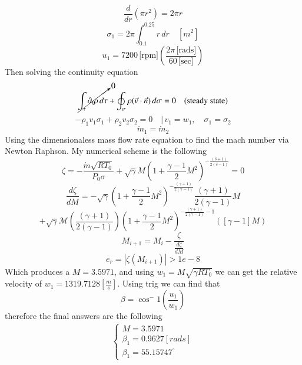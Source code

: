 \documentclass[12pt]{exam}
\begin{document}
\begin{questions}
\begin{solutionorbox}[\stretch{1}]
\[\frac{d}{dr} \left( \pi r^2 \right) = 2 \pi r\]
\[\sigma_1 = 2 \pi \int_{0.1}^{0.25} r \, dr \quad \left[ m^2 \right]\]
\[u_1 = 7200 \, \text{[rpm]} \left( \frac{2 \pi \, \text{[rads]}}{60 \, \text{[sec]}} \right)\]
Then solving the continuity equation
\[\cancelto{0}{\int_{\tau} \partial_t \rho \, d\tau} + \oint_{\sigma} \rho (\vec{v} \cdot \vec{n}) \, d\sigma = 0
\quad \text{(steady state)}\]
\[-\rho_1 v_1 \sigma_1 + \rho_2 v_2 \sigma_2 = 0 \quad \Bigg| \, v_1 = w_1, \quad \sigma_1 = \sigma_2\]
\[\dot{m}_1 = \dot{m}_2\]
Using the dimensionaless mass flow rate equation to find the mach number via Newton Raphson.
My numerical scheme is the following
\[\zeta = -\frac{\dot{m}\sqrt{R T_0}}{P_0 \sigma} + \sqrt{\gamma} M \left( 1 + \frac{\gamma-1}{2} M^2 \right)^{-\frac{(\delta+1)}{2(\delta-1)}} = 0
\]
\[
\frac{d\zeta}{dM} = - \sqrt{\gamma} \left( 1 + \frac{\gamma-1}{2} M^2 \right)^{-\frac{(\gamma+1)}{2(\gamma-1)}} \frac{(\gamma+1)}{2(\gamma-1)} M
\]\[ +\sqrt{\gamma} \mathcal{M} \left( \frac{(\gamma+1)}{2(\gamma-1)} \right) \left( 1 + \frac{\gamma-1}{2} M^2 \right)^{-\frac{(\gamma+1)}{2(\gamma-1)} - 1} 
\left( [\gamma - 1] M \right)
\]
\[M_{i+1} = M_i - \frac{\zeta}{\frac{d\zeta}{dM}}
\]
\[e_r = \left| \zeta(M_{i+1}) \right| > 1e-8
\]
Which produces a \(M = 3.5971\), and using \(w_1 = M\sqrt{\gamma R T_0}\) we can get the relative velocity of \(w_1 = 1319.7128 \left[\frac{m}{s}\right]\). Using trig we can find that 
\[\beta = \cos^-1\left(\frac{u_1}{w_1}\right)\]
therefore the final answers are the following
\begin{align*}
\begin{cases}
  M = 3.5971\\
  \beta_1 = 0.9627 \left[rads\right]\\
  \beta_1 = 55.15747^\circ
\end{cases}
\end{align*}

\end{solutionorbox}

\end{questions}
\end{document}
